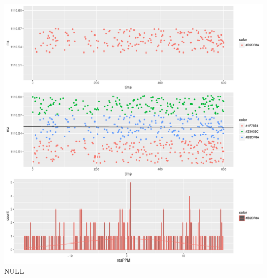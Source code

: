 \documentclass[]{article}
\begin{document}
\includegraphics{Supplementary_document_files/figure-latex/filter.lm.1110-1.pdf}
NULL
\end{document}

